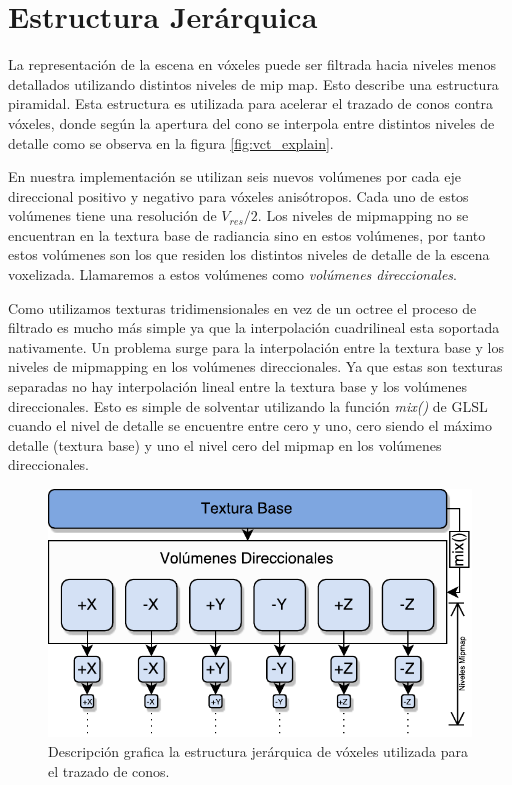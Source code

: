 \section{Estructura Jerárquica} %
\label{sec:estructura_jerarquica_impl}
La representación de la escena en vóxeles puede ser filtrada hacia niveles menos detallados utilizando distintos niveles de mip map. Esto describe una estructura piramidal. Esta estructura es utilizada para acelerar el trazado de conos contra vóxeles, donde según la apertura del cono se interpola entre distintos niveles de detalle como se observa en la figura \ref{fig:vct_explain}.

En nuestra implementación se utilizan seis nuevos volúmenes por cada eje direccional positivo y negativo para vóxeles anisótropos. Cada uno de estos volúmenes tiene una resolución de $V_{res}/{2}$. Los niveles de mipmapping no se encuentran en la textura base de radiancia sino en estos volúmenes, por tanto estos volúmenes son los que residen los distintos niveles de detalle de la escena voxelizada. Llamaremos a estos volúmenes como \emph{volúmenes direccionales}.

Como utilizamos texturas tridimensionales en vez de un octree el proceso de filtrado es mucho más simple ya que la interpolación cuadrilineal esta soportada nativamente. Un problema surge para la interpolación entre la textura base y los niveles de mipmapping en los volúmenes direccionales. Ya que estas son texturas separadas no hay interpolación lineal entre la textura base y los volúmenes direccionales. Esto es simple de solventar utilizando la función \emph{mix()} de GLSL cuando el nivel de detalle se encuentre entre cero y uno, cero siendo el máximo detalle (textura base) y uno el nivel cero del mipmap en los volúmenes direccionales.

\begin{figure}[H]
    \centering
    \includegraphics[width=.8\linewidth]{media/hierarchy.pdf}
    \caption{Descripción grafica la estructura jerárquica de vóxeles utilizada para el trazado de conos.}
\end{figure}

